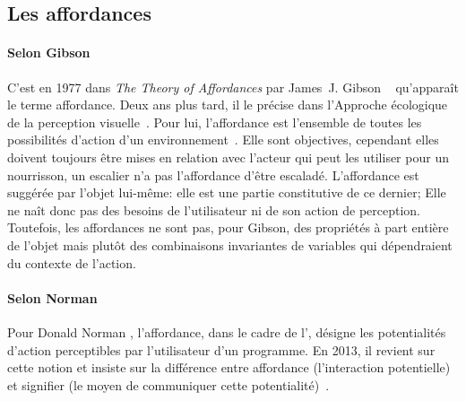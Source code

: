     \subsection{Les affordances}\label{sec:affordance}
        \paragraph{Selon Gibson}
            C'est en 1977 dans \textit{The Theory of Affordances} par James~J. Gibson ~ qu'apparaît le terme affordance. Deux ans plus tard, il le précise dans l'Approche écologique de la perception visuelle~. Pour lui, l'affordance est l'ensemble de toutes les possibilités d'action d'un environnement~. Elle sont objectives, cependant elles doivent toujours être mises en relation avec l'acteur qui peut les utiliser \eg pour un nourrisson, un escalier n'a pas l'affordance d'être escaladé. L'affordance est suggérée par l'objet lui-même: elle est une partie constitutive de ce dernier; Elle ne naît donc pas des besoins de l'utilisateur ni de son action de perception. Toutefois, les affordances ne sont pas, pour Gibson, des propriétés à part entière de l'objet mais plutôt des combinaisons invariantes de variables qui dépendraient du contexte de l'action.
        \paragraph{Selon Norman}
            Pour Donald Norman , l'affordance, dans le cadre de l', désigne les potentialités d'action perceptibles par l'utilisateur d'un programme. En 2013, il revient sur cette notion et insiste sur la différence entre affordance (l'interaction potentielle) et signifier (le moyen de communiquer cette potentialité)~.
